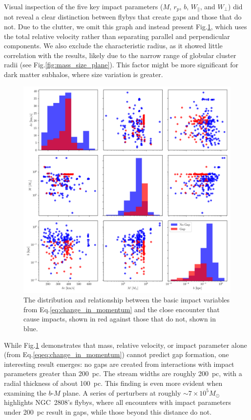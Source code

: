 \documentclass{aa}
\begin{document}
\begin{appendix}
      Visual inspection of the five key impact parameters ($M$, $r_p$, $b$, $W_\parallel$, and $W_\perp$) did not reveal a clear distinction between flybys that create gaps and those that do not. Due to the clutter, we omit this graph and instead present Fig.\ref{fig:impact_geometry_statistics}, which uses the total relative velocity rather than separating parallel and perpendicular components. We also exclude the characteristic radius, as it showed little correlation with the results, likely due to the narrow range of globular cluster radii (see Fig.\ref{fig:mass_size_plane}). This factor might be more significant for dark matter subhalos, where size variation is greater.
      
      
      \begin{figure}
        \centering
        \includegraphics[width=\linewidth]{impact_geometry_statistics.png}
        \caption{The distribution and relationship between the basic impact variables from Eq.\ref{eq:change_in_momentum} and the close encounter that cause impacts, shown in red against those that do not, shown in blue. }
        \label{fig:impact_geometry_statistics}    
        \end{figure}

      While Fig.\ref{fig:impact_geometry_statistics} demonstrates that mass, relative velocity, or impact parameter alone (from Eq.\ref{eqeq:change_in_momentum}) cannot predict gap formation, one interesting result emerges: no gaps are created from interactions with impact parameters greater than 200~pc. The stream widths are roughly 200~pc, with a radial thickness of about 100~pc. This finding is even more evident when examining the $b$-$M$ plane. A series of perturbers at roughly $\sim7 \times 10^5 M_\odot$ highlights NGC~2808's flybys, where all encounters with impact parameters under 200~pc result in gaps, while those beyond this distance do not.
        

\end{appendix}
\end{document}
